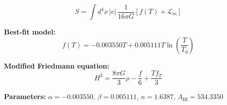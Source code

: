 
\begin{equation}
  S = \int d^4x \, |e| \, \frac{1}{16\pi G} \left[ f(T) + \mathcal{L}_m \right]
\end{equation}

\textbf{Best-fit model:}
\begin{equation}
  f(T) = -0.003550 T + 0.005111 T \ln\!\left(\frac{T}{T_0}\right)
\end{equation}

\textbf{Modified Friedmann equation:}
\begin{equation}
  H^2 = \frac{8\pi G}{3} \rho - \frac{f}{6} + \frac{T f_T}{3}
\end{equation}

\textbf{Parameters:}
$\alpha = -0.003550$, \quad
$\beta = 0.005111$, \quad
$n = 1.6387$, \quad
$\Lambda_{\text{BI}} = 534.3350$